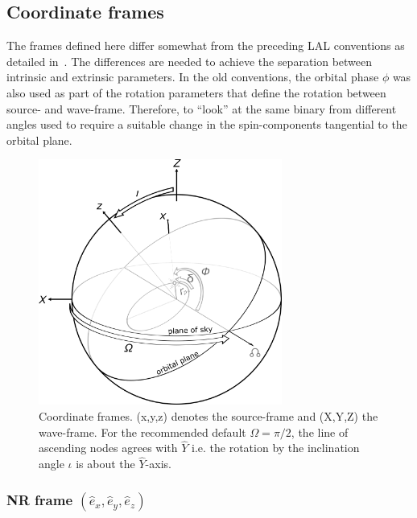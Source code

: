 \documentclass[11pt,tightenlines,article,amssymb,amsmath,amsfonts,superscriptaddress,nofootinbib]{revtex4}
\newcommand{\ExNR}{\hat e_x}
\newcommand{\EyNR}{\hat e_y}
\newcommand{\EzNR}{\hat e_z}
\newcommand{\EyW}{\hat Y}
\begin{document}
\subsection{Coordinate frames}
\label{sec:Frames}

The frames defined here differ somewhat from the preceding LAL
conventions as detailed in~\cite{inspiral}.
The differences are needed to achieve the separation between intrinsic
and extrinsic parameters.  In the old conventions, the orbital phase
$\phi$ was also used as part of the rotation parameters that define
the rotation between source- and wave-frame.  Therefore, to ``look''
at the same binary from different angles used to require a suitable
change in the spin-components tangential to the orbital plane.


\begin{figure}
  \includegraphics[width=80mm]{NRinj_orbitalelements.png}
  \caption{
  \label{fig:frames} Coordinate frames.
  (x,y,z) denotes the source-frame and (X,Y,Z) the wave-frame. For the recommended default
    $\Omega=\pi/2$, the line of ascending nodes agrees with $\EyW$
    i.e. the rotation by the inclination angle $\iota$ is about the
    $\EyW$-axis.}
  \end{figure}


\subsubsection{NR frame \boldmath$(  \ExNR, \EyNR, \EzNR)$}
\end{document}
